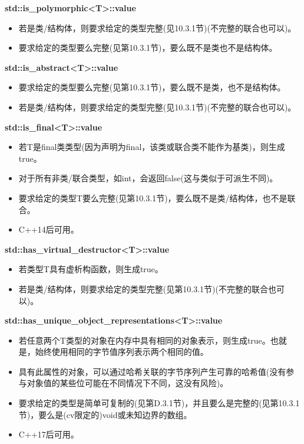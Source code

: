 \textbf{std::is\_polymorphic<T>::value}

\begin{itemize}
\item 
若是类/结构体，则要求给定的类型完整(见10.3.1节)(不完整的联合也可以)。

\item 
要求给定的类型要么完整(见第10.3.1节)，要么既不是类也不是结构体。
\end{itemize}

\textbf{std::is\_abstract<T>::value}

\begin{itemize}
\item 
要求给定的类型要么完整(见第10.3.1节)，要么既不是类，也不是结构体。

\item 
若是类/结构体，则要求给定的类型完整(见10.3.1节)(不完整的联合也可以)。
\end{itemize}

\textbf{std::is\_final<T>::value}

\begin{itemize}
\item 
若T是final类类型(因为声明为final，该类或联合类不能作为基类)，则生成true。

\item 
对于所有非类/联合类型，如int，会返回false(这与类似于可派生不同)。

\item 
要求给定的类型T要么完整(见第10.3.1节)，要么既不是类/结构体，也不是联合。

\item 
C++14后可用。
\end{itemize}

\textbf{std::has\_virtual\_destructor<T>::value}

\begin{itemize}
\item 
若类型T具有虚析构函数，则生成true。

\item 
若是类/结构体，则要求给定的类型完整(见第10.3.1节)(不完整的联合也可以)。
\end{itemize}

\textbf{std::has\_unique\_object\_representations<T>::value}

\begin{itemize}
\item 
若任意两个T类型的对象在内存中具有相同的对象表示，则生成true。也就是，始终使用相同的字节值序列表示两个相同的值。

\item 
具有此属性的对象，可以通过哈希关联的字节序列产生可靠的哈希值(没有参与对象值的某些位可能在不同情况下不同，这没有风险)。

\item 
要求给定的类型是简单可复制的(见第D.3.1节)，并且要么是完整的(见第10.3.1节)，要么是(cv限定的)void或未知边界的数组。

\item 
C++17后可用。
\end{itemize}

